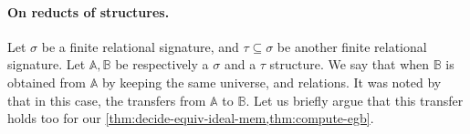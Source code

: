 %
%


\paragraph{On reducts of structures.} \AP Let $\sigma$ be a finite relational
signature, and $\tau \subseteq \sigma$ be another finite relational signature.
Let $\mathbb{A}, \mathbb{B}$ be respectively a $\sigma$ and a $\tau$ structure. We say
that  when $\mathbb{B}$ is
obtained from $\mathbb{A}$ by keeping the same universe, and relations. It was noted by \cite[Lemma 13]{GHOLAS24} that in
this case, the  transfers from
$\mathbb{A}$ to $\mathbb{B}$. Let us briefly argue that this transfer holds too
for our \cref{thm:decide-equiv-ideal-mem,thm:compute-egb}.


